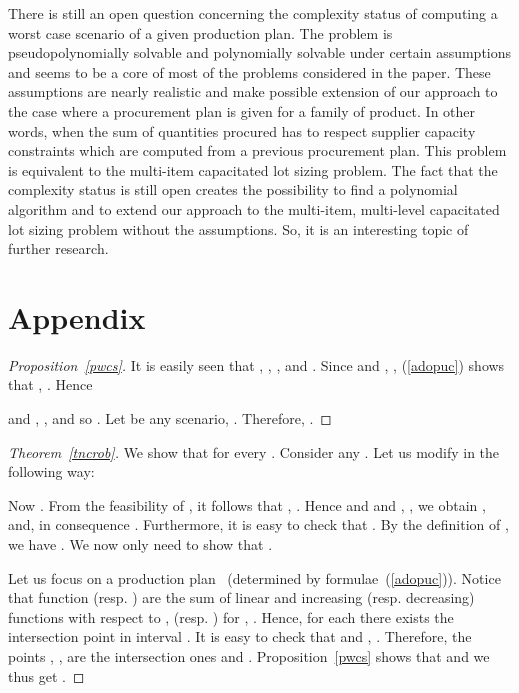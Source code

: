 \documentclass[11pt]{article}
\begin{document}
There is still  an open question concerning 
the complexity status of computing a worst case scenario
of a given production plan.
The problem
 is pseudopolynomially  solvable and polynomially solvable under certain assumptions and
seems to be
a core  of  most of the problems considered in the paper.
These assumptions are nearly realistic and  make possible 
extension of our approach to 
the case where a
procurement plan is given for a family of product.
In other words, when the sum of quantities
procured has to respect  supplier capacity constraints  which are computed from a previous
procurement plan. This problem  is equivalent to the multi-item capacitated lot sizing problem.
The fact that the complexity status is still open
 creates the possibility
 to find a polynomial algorithm
and to  extend our approach to the multi-item, multi-level capacitated lot sizing problem without
the assumptions.
So, it is 
an interesting topic of further
research.






\appendix

\section{Appendix}
\label{dod}


\begin{proof}[Proposition~\ref{pwcs}] 
It is easily seen that 
,
, , and .
Since  and 
, ,
 (\ref{adopuc})
shows that , .
Hence

and 
, 
, and so .
Let  be any scenario, .  
Therefore,
.
\end{proof}

\begin{proof}[Theorem~\ref{tncrob}]
We show that  for every .
Consider any . Let us modify  in the following way:

Now .
From the feasibility of , it follows that 
 , .
 Hence and  
 and 
, ,
we obtain ,  and, in
consequence . Furthermore, it is easy to check that
. By the definition of , we have
.
We now only need to show that .

Let us focus on a production plan~ (determined by formulae~(\ref{adopuc})).
Notice that function 
(resp. )
are the sum of  linear and increasing  (resp. decreasing) functions 
 with respect to ,  
 (resp. ) for
 , .
 Hence, for each  there exists the intersection point in interval
 .
 It is easy to check that 
 and
, .
Therefore, the points ,  ,
 are the intersection ones and
. Proposition~\ref{pwcs}
shows that  and we thus get
.
 \end{proof}
\end{document}
